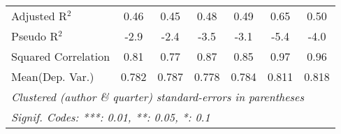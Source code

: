 \begin{tabular}{lcccccc}
   Adjusted R$^2$                                             & 0.46    & 0.45    & 0.48    & 0.49    & 0.65         & 0.50\\  
   Pseudo R$^2$                                               & -2.9    & -2.4    & -3.5    & -3.1    & -5.4         & -4.0\\  
   Squared Correlation                                        & 0.81    & 0.77    & 0.87    & 0.85    & 0.97         & 0.96\\  
Mean(Dep. Var.) & 0.782 & 0.787 & 0.778 & 0.784 & 0.811 & 0.818 \\
   \midrule \midrule
   \multicolumn{7}{l}{\emph{Clustered (author \& quarter) standard-errors in parentheses}}\\
   \multicolumn{7}{l}{\emph{Signif. Codes: ***: 0.01, **: 0.05, *: 0.1}}\\
\end{tabular}
\par\endgroup
